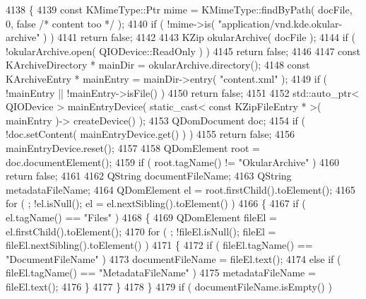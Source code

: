 \begin{DoxyCode}
4138 \{
4139     \textcolor{keyword}{const} KMimeType::Ptr mime = KMimeType::findByPath( docFile, 0, \textcolor{keyword}{false} \textcolor{comment}{/* content too */} );
4140     \textcolor{keywordflow}{if} ( !mime->is( \textcolor{stringliteral}{"application/vnd.kde.okular-archive"} ) )
4141         \textcolor{keywordflow}{return} \textcolor{keyword}{false};
4142 
4143     KZip okularArchive( docFile );
4144     \textcolor{keywordflow}{if} ( !okularArchive.open( QIODevice::ReadOnly ) )
4145        \textcolor{keywordflow}{return} \textcolor{keyword}{false};
4146 
4147     \textcolor{keyword}{const} KArchiveDirectory * mainDir = okularArchive.directory();
4148     \textcolor{keyword}{const} KArchiveEntry * mainEntry = mainDir->entry( \textcolor{stringliteral}{"content.xml"} );
4149     \textcolor{keywordflow}{if} ( !mainEntry || !mainEntry->isFile() )
4150         \textcolor{keywordflow}{return} \textcolor{keyword}{false};
4151 
4152     std::auto\_ptr< QIODevice > mainEntryDevice( static\_cast< const KZipFileEntry * >( mainEntry )->
      createDevice() );
4153     QDomDocument doc;
4154     \textcolor{keywordflow}{if} ( !doc.setContent( mainEntryDevice.get() ) )
4155         \textcolor{keywordflow}{return} \textcolor{keyword}{false};
4156     mainEntryDevice.reset();
4157 
4158     QDomElement root = doc.documentElement();
4159     \textcolor{keywordflow}{if} ( root.tagName() != \textcolor{stringliteral}{"OkularArchive"} )
4160         \textcolor{keywordflow}{return} \textcolor{keyword}{false};
4161 
4162     QString documentFileName;
4163     QString metadataFileName;
4164     QDomElement el = root.firstChild().toElement();
4165     \textcolor{keywordflow}{for} ( ; !el.isNull(); el = el.nextSibling().toElement() )
4166     \{
4167         \textcolor{keywordflow}{if} ( el.tagName() == \textcolor{stringliteral}{"Files"} )
4168         \{
4169             QDomElement fileEl = el.firstChild().toElement();
4170             \textcolor{keywordflow}{for} ( ; !fileEl.isNull(); fileEl = fileEl.nextSibling().toElement() )
4171             \{
4172                 \textcolor{keywordflow}{if} ( fileEl.tagName() == \textcolor{stringliteral}{"DocumentFileName"} )
4173                     documentFileName = fileEl.text();
4174                 \textcolor{keywordflow}{else} \textcolor{keywordflow}{if} ( fileEl.tagName() == \textcolor{stringliteral}{"MetadataFileName"} )
4175                     metadataFileName = fileEl.text();
4176             \}
4177         \}
4178     \}
4179     \textcolor{keywordflow}{if} ( documentFileName.isEmpty() )

\end{DoxyCode}
